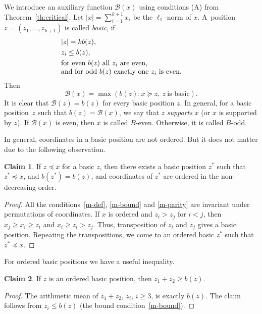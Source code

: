 \documentclass{article}
\theoremstyle{definition}
\newtheorem{claim}{Claim}
\def\B{\mathcal{B}}
\begin{document}
We introduce an auxiliary function $\B(x)$ using conditions (A) from Theorem~\ref{th:critical}. Let $|x| = \sum_{i=1}^{k+1}x_i$ be the $\ell_1$-norm of $x$. A~position $z=(z_1,\dots,z_{k+1})$ is called \emph{basic}, if 
\begin{align}
  &|z| = kb(z),\label{m-def}\\
  &z_i\leq b(z),\label{m-bound}\\
  &\text{\parbox{7cm}{for even $b(z)$ all $z_i$ are even,\\ and for odd $b(z)$ exactly one $z_i$ is even.}}\label{m-parity}
\end{align}
Then
\begin{equation}\label{eq:G-def}
\B(x) = \max (b(z) : x\succeq z,\ z\ \text{is basic}).
\end{equation}
It is clear that $\B(z) = b(z)$ for every basic position $z$. In general,  for a basic position~$z$ such that $b(z) = \B(x)$,  we say that $z$ \emph{supports} $x$ (or $x$ is supported by $z$). 
If $\B(x)$ is even, then $x$ is called $B$-even. Otherwise, it is called $B$-odd.



In general, coordinates in a basic position are not ordered. But it does not matter due to the following observation. 
\begin{claim}\label{ordered}
  If   $z\preceq x$ for a basic $z$, then there exists a
  basic position $z^*$ such that $z^*\preceq x$,  and $b(z^*) = b(z)$, and   coordinates of   $z^*$ are ordered in the non-decreasing order.
\end{claim}
\begin{proof} All the conditions~\eqref{m-def}, \eqref{m-bound} and \eqref{m-parity} are invariant  under  permutations of coordinates. If $x$ is ordered and $z_i>z_j$ for $i<j$, then $x_j\geq x_i\geq z_i$ and $x_i\geq z_i> z_j$. Thus, transposition of $z_i$ and $z_j$ gives a basic position. Repeating the transpositions, we come to an ordered basic $z^*$ such that  $z^*\preceq x$.
\end{proof}

For ordered basic positions we have a useful inequality.

\begin{claim}\label{12bound}
 If  $z$ is an ordered basic position, then $z_1+z_2 \geq b(z)$.
\end{claim}
\begin{proof}
The arithmetic mean of $z_1+z_2$, $z_i$, $i\geq3$, is exactly $b(z)$. The claim 
follows from  $z_i\leq b(z)$ (the bound condition~\eqref{m-bound}).
\end{proof}
\end{document}
